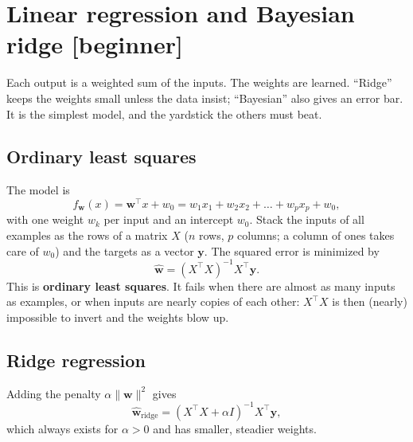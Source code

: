 \documentclass[11pt]{article}
\newcommand{\level}[1]{\hfill{\normalfont\small\color{black!60}[#1]}}
\begin{document}
\section{Linear regression and Bayesian ridge \level{beginner}}
\label{sec:linear}

\begin{idea}
Each output is a weighted sum of the inputs. The weights are learned. ``Ridge'' keeps the weights small unless the data insist;
``Bayesian'' also gives an error bar. It is the simplest model, and the yardstick the others must beat.
\end{idea}

\subsection{Ordinary least squares}
The model is
\begin{equation}
f_{\bm w}(x) = \bm w^\top x + w_0 = w_1x_1 + w_2x_2 + \dots + w_p x_p + w_0 ,
\end{equation}
with one weight $w_k$ per input and an intercept $w_0$. Stack the inputs of all examples as the rows of a matrix $X$ ($n$ rows,
$p$ columns; a column of ones takes care of $w_0$) and the targets as a vector $\bm y$. The squared error is minimized by
\begin{equation}
\hat{\bm w} = (X^\top X)^{-1}X^\top\bm y .
\end{equation}
This is \textbf{ordinary least squares}. It fails when there are almost as many inputs as examples, or when inputs are nearly copies
of each other: $X^\top X$ is then (nearly) impossible to invert and the weights blow up.

\subsection{Ridge regression}
Adding the penalty $\alpha\lVert\bm w\rVert^2$ gives
\begin{equation}
\hat{\bm w}_\text{ridge} = (X^\top X + \alpha I)^{-1}X^\top\bm y ,
\end{equation}
which always exists for $\alpha > 0$ and has smaller, steadier weights.
\end{document}
